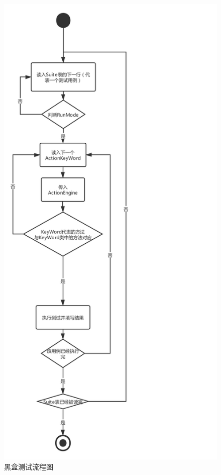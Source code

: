 \documentclass[hyperref, a4paper]{ctexart}
\begin{document}
\begin{figure}
  \centering
  \includegraphics[scale=0.5]{./FlowChart.pdf}
  \caption{黑盒测试流程图}\label{1}
\end{figure}
\end{document}
